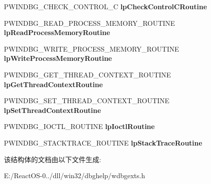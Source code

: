\begin{DoxyCompactItemize}
P\+W\+I\+N\+D\+B\+G\+\_\+\+C\+H\+E\+C\+K\+\_\+\+C\+O\+N\+T\+R\+O\+L\+\_\+C {\bfseries lp\+Check\+Control\+C\+Routine}
\item 
\mbox{\label{struct___w_i_n_d_b_g___e_x_t_e_n_s_i_o_n___a_p_i_s_af2c71dba3f2560bdec7eaefe5fdc79c7}} 
P\+W\+I\+N\+D\+B\+G\+\_\+\+R\+E\+A\+D\+\_\+\+P\+R\+O\+C\+E\+S\+S\+\_\+\+M\+E\+M\+O\+R\+Y\+\_\+\+R\+O\+U\+T\+I\+NE {\bfseries lp\+Read\+Process\+Memory\+Routine}
\item 
\mbox{\label{struct___w_i_n_d_b_g___e_x_t_e_n_s_i_o_n___a_p_i_s_a37d0cc2cdf7bf26c7e737e85bcf5e784}} 
P\+W\+I\+N\+D\+B\+G\+\_\+\+W\+R\+I\+T\+E\+\_\+\+P\+R\+O\+C\+E\+S\+S\+\_\+\+M\+E\+M\+O\+R\+Y\+\_\+\+R\+O\+U\+T\+I\+NE {\bfseries lp\+Write\+Process\+Memory\+Routine}
\item 
\mbox{\label{struct___w_i_n_d_b_g___e_x_t_e_n_s_i_o_n___a_p_i_s_a43186b0a92c3b951af22ec1c844ec68a}} 
P\+W\+I\+N\+D\+B\+G\+\_\+\+G\+E\+T\+\_\+\+T\+H\+R\+E\+A\+D\+\_\+\+C\+O\+N\+T\+E\+X\+T\+\_\+\+R\+O\+U\+T\+I\+NE {\bfseries lp\+Get\+Thread\+Context\+Routine}
\item 
\mbox{\label{struct___w_i_n_d_b_g___e_x_t_e_n_s_i_o_n___a_p_i_s_a2296cb7945f65a961bf394f37f7c41a4}} 
P\+W\+I\+N\+D\+B\+G\+\_\+\+S\+E\+T\+\_\+\+T\+H\+R\+E\+A\+D\+\_\+\+C\+O\+N\+T\+E\+X\+T\+\_\+\+R\+O\+U\+T\+I\+NE {\bfseries lp\+Set\+Thread\+Context\+Routine}
\item 
\mbox{\label{struct___w_i_n_d_b_g___e_x_t_e_n_s_i_o_n___a_p_i_s_adf84899c6f55e9d3253dfb07cbc7a7d1}} 
P\+W\+I\+N\+D\+B\+G\+\_\+\+I\+O\+C\+T\+L\+\_\+\+R\+O\+U\+T\+I\+NE {\bfseries lp\+Ioctl\+Routine}
\item 
\mbox{\label{struct___w_i_n_d_b_g___e_x_t_e_n_s_i_o_n___a_p_i_s_adaad915e4cd4a59ee6386e224ee7bddf}} 
P\+W\+I\+N\+D\+B\+G\+\_\+\+S\+T\+A\+C\+K\+T\+R\+A\+C\+E\+\_\+\+R\+O\+U\+T\+I\+NE {\bfseries lp\+Stack\+Trace\+Routine}
\end{DoxyCompactItemize}


该结构体的文档由以下文件生成\+:\begin{DoxyCompactItemize}
\item 
E\+:/\+React\+O\+S-\/0../dll/win32/dbghelp/wdbgexts.\+h\end{DoxyCompactItemize}
